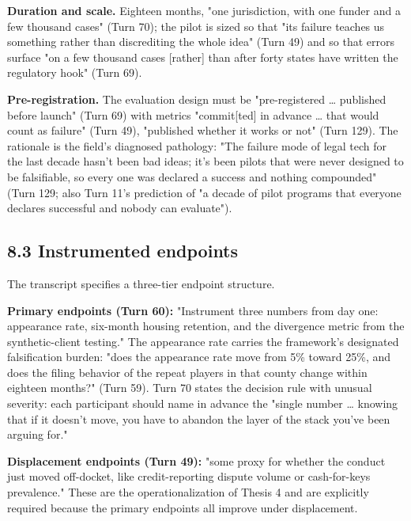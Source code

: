 \documentclass[sigconf,nonacm=true]{acmart}
\begin{document}
\textbf{Duration and scale.} Eighteen months, "one jurisdiction, with one funder and a few thousand cases" (Turn 70); the pilot is sized so that "its failure teaches us something rather than discrediting the whole idea" (Turn 49) and so that errors surface "on a few thousand cases [rather] than after forty states have written the regulatory hook" (Turn 69).

\textbf{Pre-registration.} The evaluation design must be "pre-registered … published before launch" (Turn 69) with metrics "commit[ted] in advance … that would count as failure" (Turn 49), "published whether it works or not" (Turn 129). The rationale is the field's diagnosed pathology: "The failure mode of legal tech for the last decade hasn't been bad ideas; it's been pilots that were never designed to be falsifiable, so every one was declared a success and nothing compounded" (Turn 129; also Turn 11's prediction of "a decade of pilot programs that everyone declares successful and nobody can evaluate").

\subsection{8.3 Instrumented endpoints}

The transcript specifies a three-tier endpoint structure.

\textbf{Primary endpoints (Turn 60):} "Instrument three numbers from day one: appearance rate, six-month housing retention, and the divergence metric from the synthetic-client testing." The appearance rate carries the framework's designated falsification burden: "does the appearance rate move from 5\% toward 25\%, and does the filing behavior of the repeat players in that county change within eighteen months?" (Turn 59). Turn 70 states the decision rule with unusual severity: each participant should name in advance the "single number … knowing that if it doesn't move, you have to abandon the layer of the stack you've been arguing for."

\textbf{Displacement endpoints (Turn 49):} "some proxy for whether the conduct just moved off-docket, like credit-reporting dispute volume or cash-for-keys prevalence." These are the operationalization of Thesis 4 and are explicitly required because the primary endpoints all improve under displacement.
\end{document}
